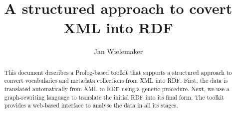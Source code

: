 \documentclass[11pt]{article}
\begin{document}
\title{A structured approach to covert XML into RDF}
\author{Jan Wielemaker}

\maketitle

\begin{abstract}
This document describes a Prolog-based toolkit that supports a
structured approach to convert vocabularies and metadata collections
from XML into RDF.  First, the data is translated automatically from
XML to RDF using a generic procedure.  Next, we use a graph-rewriting
language to translate the initial RDF into its final form.  The toolkit
provides a web-based interface to analyse the data in all its stages.
\end{abstract}

\pagebreak
\tableofcontents

\vfill
\vfill

\newpage


\end{document}
